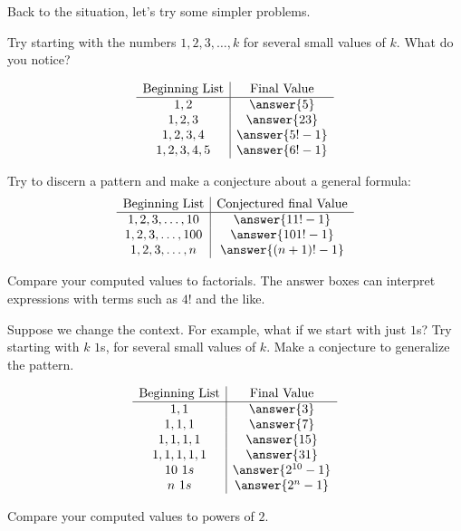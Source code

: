 \documentclass{ximera}
\begin{document}
\newpage
Back to the situation, let's try some simpler problems.  

\begin{problem}
Try starting with the numbers $1,2,3,\dots, k$ for several small values of $k$.  What do you notice?  

\[
\begin{array}{c|c}
\text{Beginning List}& \text{Final Value} \\
\hline
1,  2 & \answer{5}  \\
1,  2,  3 & \answer{23} \\  
1,  2,  3 ,  4 & \answer{5!-1} \\
1,  2,  3 ,  4 ,  5 & \answer{6!-1}
\end{array}
\]
\begin{problem}
Try to discern a pattern and make a conjecture about a general formula:  
\[
\begin{array}{c|c}
\text{Beginning List}& \text{Conjectured final Value} \\
\hline
1,  2,  3 ,  \dots, 10 & \answer{11!-1} \\
1,  2,  3 ,  \dots, 100 & \answer{101!-1} \\
1,  2,  3 ,  \dots, n & \answer{(n+1)!-1} 
\end{array}
\]

\begin{hint}
Compare your computed values to factorials.  The answer boxes can interpret expressions with terms such as $4!$ and the like. 
\end{hint}
\end{problem}
\end{problem}

\begin{problem}
Suppose we change the context.  For example, what if we start with just $1$s?  Try starting with $k$ $1$s, for several small values of $k$.  Make a conjecture to generalize the pattern.    


\[
\begin{array}{c|c}
\text{Beginning List}& \text{Final Value} \\
\hline
1,  1 & \answer{3}  \\
1,  1,  1 & \answer{7} \\  
1,  1,  1 ,  1 & \answer{15} \\
1,  1,  1 ,  1 ,  1 & \answer{31} \\
10\ 1s & \answer{2^{10}-1} \\
n\ 1s & \answer{2^n-1} 
\end{array}
\]
\begin{hint}
Compare your computed values to powers of $2$. 
\end{hint}
\end{problem}
\end{document}
